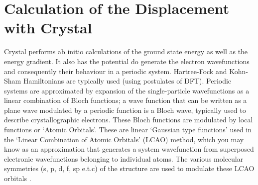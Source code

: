\documentclass[10pt]{article}
\begin{document}




\section{Calculation of the Displacement with Crystal}
Crystal performs ab initio calculations of the ground state energy as well as the energy gradient. It also has the potential do generate the electron wavefunctions and consequently their behaviour in a periodic system. Hartree-Fock and Kohn-Sham Hamiltonians are typically used (using postulates of DFT). Periodic systems are approximated by expansion of the single-particle wavefunctions as a linear combination of Bloch functions; a wave function that can be written as a plane wave modulated by a periodic function is a Bloch wave, typically used to describe crystallographic electrons. These Bloch functions are modulated by local functions or `Atomic Orbitals'. These are linear `Gaussian type functions' used in the `Linear Combination of Atomic Orbitals' (LCAO) method, which you may know as an approximation that generates a system wavefunction from superposed electronic wavefunctions belonging to individual atoms. The various molecular symmetries (s, p, d, f, sp e.t.c) of the structure are used to modulate these LCAO orbitals \cite{dovesi2017crystal17}.
\end{document}
